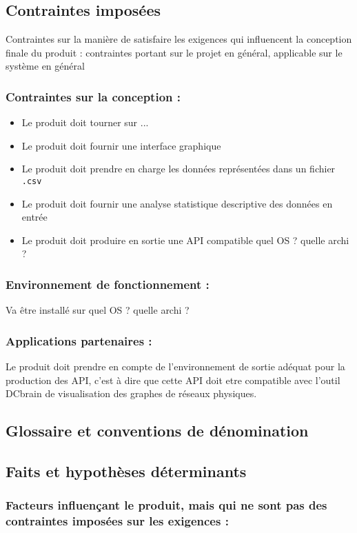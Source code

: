 		\subsection{Contraintes imposées}
		{\color{red}Contraintes sur la manière de satisfaire les exigences qui influencent la conception finale du produit : contraintes portant sur le projet en général, applicable sur le système en général}
			\subsubsection{Contraintes sur la conception :} 
				\begin{itemize}
					\item Le produit doit tourner sur ...
					\item Le produit doit fournir une interface graphique
					\item Le produit doit prendre en charge les données représentées dans un fichier \lstinline!.csv!
					\item Le produit doit fournir une analyse statistique descriptive des données en entrée
					\item Le produit doit produire en sortie une API compatible
					quel OS ? quelle archi ?
				\end{itemize}
			\subsubsection{Environnement de fonctionnement :} Va être installé sur quel OS ? quelle archi ?
			\subsubsection{Applications partenaires :} 
			Le produit doit prendre en compte de l'environnement de sortie adéquat pour la production des API, c'est à dire que cette API doit etre compatible avec l'outil DCbrain de visualisation des graphes de réseaux physiques.
		
		\subsection{Glossaire et conventions de dénomination}
		
		\subsection{Faits et hypothèses déterminants}
			\subsubsection{Facteurs influençant le produit, mais qui ne sont pas des contraintes imposées sur les exigences :}
